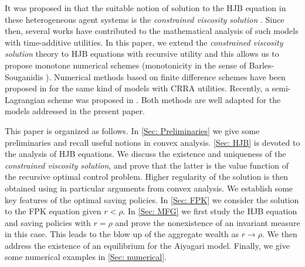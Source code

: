 \documentclass[11pt]{article}
\numberwithin{equation}{section}
\theoremstyle{definition}
\theoremstyle{plain}
\begin{document}
It was proposed in \cite{achdou2022income} that the suitable notion of solution to the HJB equation in these heterogeneous agent systems is the {\it{constrained viscosity solution}} \cite{capuzzo1990hamilton}. Since then, several works  \cite{camilli2025semi,hofer2025price,shigeta2023existence} {}{have contributed to the mathematical analysis of} such models with time-additive utilities. In this paper, we extend the {\it{constrained viscosity solution}} theory to HJB equations with recursive utility and this allows us to propose monotone numerical schemes (monotonicity in the sense of Barles-Souganidis \cite{barles1991convergence}).
Numerical methods based on finite difference schemes have been proposed in \cite{achdou2022income} for the same kind of models with CRRA utilities. Recently, a semi-Lagrangian scheme was proposed in \cite{camilli2025semi}. Both methods are well adapted for the models addressed in the present paper. \par
This paper is organized as follows. In \cref{Sec: Preliminaries} we give some preliminaries and recall useful notions in convex analysis. \cref{Sec: HJB} is devoted to the analysis of HJB equations. We discuss the existence and uniqueness of the {\it{constrained viscosity solution}}, and prove that the latter is the value function of the recursive optimal control problem. Higher regularity of the solution is then obtained using in particular arguments from convex analysis. We establish some key features of the optimal saving policies. In \cref{Sec: FPK} we consider the solution to the FPK equation given $r<\rho$. In \cref{Sec: MFG} we first study the HJB equation and saving policies with $r=\rho$ and prove the nonexistence of an invariant measure in this case. This leads to the blow up of the aggregate wealth as $r\to \rho$. We then address the existence of an equilibrium for the Aiyagari model. Finally, we give some numerical examples in \cref{Sec: numerical}.
\end{document}
